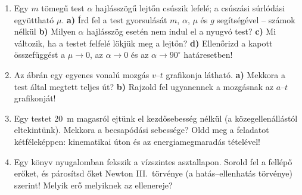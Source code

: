 \documentclass[11pt,a4paper]{article}
\begin{document}
\begin{enumerate}[leftmargin=*,label=\textbf{\arabic*.},itemsep=7pt,topsep=0pt,parsep=0pt]

\item Egy $m$ tömegű test $\alpha$ hajlásszögű lejtőn csúszik lefelé; a csúszási
súrlódási együttható $\mu$.
\textbf{a)} Írd fel a test gyorsulását $m$, $\alpha$, $\mu$ és $g$ segítségével --
számok nélkül
\textbf{b)} Milyen $\alpha$ hajlásszög esetén nem indul el a nyugvó test?
\textbf{c)} Mi változik, ha a testet felfelé lökjük meg a lejtőn?
\textbf{d)} Ellenőrizd a kapott összefüggést a $\mu\to 0$, az $\alpha\to 0$ és az
$\alpha\to 90^\circ$ határesetben!

\item
\begin{minipage}[t]{0.55\linewidth}
Az ábrán egy egyenes vonalú mozgás $v$--$t$ grafikonja látható.
\textbf{a)} Mekkora a test által megtett teljes út?
\textbf{b)} Rajzold fel ugyanennek a mozgásnak az $a$--$t$ grafikonját!
\end{minipage}\hfill
\begin{minipage}[t]{0.42\linewidth}
\vspace{0pt}
\centering
{}
\end{minipage}

\item Egy testet 20~m magasról ejtünk el kezdősebesség nélkül (a közegellenállástól
eltekintünk). Mekkora a becsapódási sebessége? Oldd meg a feladatot kétféleképpen:
kinematikai úton és az energiamegmaradás tételével!

\item Egy könyv nyugalomban fekszik a vízszintes asztallapon. Sorold fel a fellépő
erőket, és párosítsd őket Newton III.\ törvénye (a hatás--ellenhatás törvénye)
szerint! Melyik erő melyiknek az ellenereje?


\end{enumerate}
\end{document}
